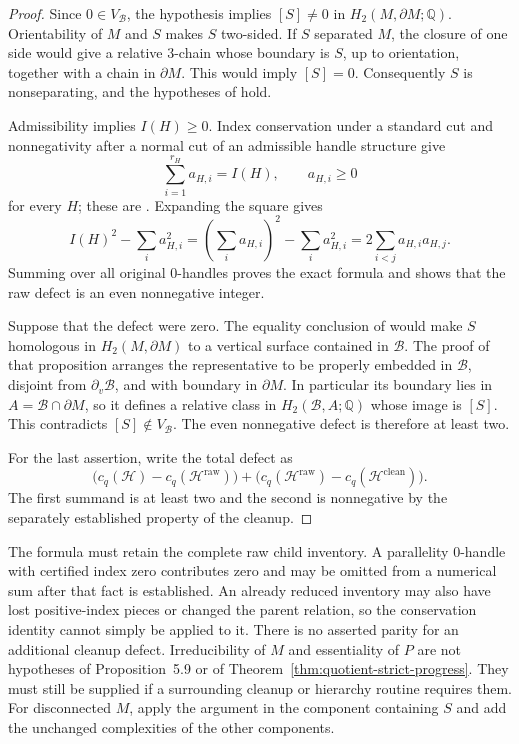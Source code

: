 \begin{proof}
Since $0\in V_{\mathcal B}$, the hypothesis implies $[S]\neq0$ in
$H_2(M,\partial M;\mathbb Q)$. Orientability of $M$ and $S$ makes $S$
two-sided. If $S$ separated $M$, the closure of one side would give a
relative $3$-chain whose boundary is $S$, up to orientation, together
with a chain in $\partial M$. This would imply $[S]=0$. Consequently
$S$ is nonseparating, and the hypotheses of
\cite[Proposition~5.9]{lackenby2026} hold.

Admissibility implies $I(H)\geq0$. Index conservation under a standard
cut and nonnegativity after a normal cut of an admissible handle
structure give
\[
 \sum_{i=1}^{r_H}a_{H,i}=I(H),\qquad a_{H,i}\geq0
\]
for every $H$; these are
\cite[Lemmas~5.2 and~5.5]{lackenby2026}. Expanding the square gives
\[
 I(H)^2-\sum_i a_{H,i}^2
 =\left(\sum_i a_{H,i}\right)^2-\sum_i a_{H,i}^2
 =2\sum_{i<j}a_{H,i}a_{H,j}.
\]
Summing over all original $0$-handles proves the exact formula and shows
that the raw defect is an even nonnegative integer.

Suppose that the defect were zero. The equality conclusion of
\cite[Proposition~5.9]{lackenby2026} would make $S$ homologous in
$H_2(M,\partial M)$ to a vertical surface contained in $\mathcal B$.
The proof of that proposition arranges the representative to be properly
embedded in $\mathcal B$, disjoint from $\partial_v\mathcal B$, and with
boundary in $\partial M$. In particular its boundary lies in
$A=\mathcal B\cap\partial M$, so it defines a relative class in
$H_2(\mathcal B,A;\mathbb Q)$ whose image is $[S]$.
This contradicts $[S]\notin V_{\mathcal B}$. The even nonnegative defect
is therefore at least two.

For the last assertion, write the total defect as
\[
 \bigl(c_q(\mathcal H)-c_q(\mathcal H^{\mathrm{raw}})\bigr)
 +\bigl(c_q(\mathcal H^{\mathrm{raw}})
                  -c_q(\mathcal H^{\mathrm{clean}})\bigr).
\]
The first summand is at least two and the second is nonnegative by the
separately established property of the cleanup.
\end{proof}

The formula must retain the complete raw child inventory. A parallelity
$0$-handle with certified index zero contributes zero and may be omitted
from a numerical sum after that fact is established. An already reduced
inventory may also have lost positive-index pieces or changed the parent
relation, so the conservation identity cannot simply be applied to it.
There is no asserted parity for an additional cleanup defect.
Irreducibility of $M$ and essentiality of $P$ are not hypotheses of
Proposition~5.9 or of Theorem~\ref{thm:quotient-strict-progress}. They must
still be supplied if a surrounding cleanup or hierarchy routine requires
them. For disconnected $M$, apply the argument in the component
containing $S$ and add the unchanged complexities of the other components.

